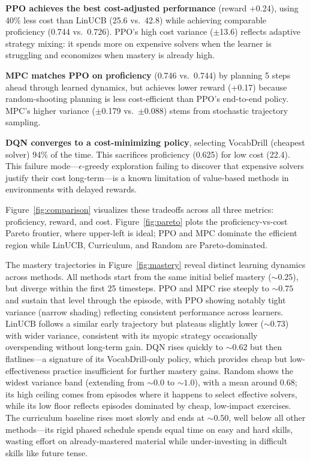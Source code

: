 \documentclass{article}
\begin{document}
\textbf{PPO achieves the best cost-adjusted performance} (reward +0.24), using 40\% less cost than LinUCB (25.6 vs.\ 42.8) while achieving comparable proficiency (0.744 vs.\ 0.726). PPO's high cost variance ($\pm$13.6) reflects adaptive strategy mixing: it spends more on expensive solvers when the learner is struggling and economizes when mastery is already high.

\textbf{MPC matches PPO on proficiency} (0.746 vs.\ 0.744) by planning 5 steps ahead through learned dynamics, but achieves lower reward (+0.17) because random-shooting planning is less cost-efficient than PPO's end-to-end policy. MPC's higher variance ($\pm$0.179 vs.\ $\pm$0.088) stems from stochastic trajectory sampling.

\textbf{DQN converges to a cost-minimizing policy}, selecting VocabDrill (cheapest solver) 94\% of the time. This sacrifices proficiency (0.625) for low cost (22.4). This failure mode---$\epsilon$-greedy exploration failing to discover that expensive solvers justify their cost long-term---is a known limitation of value-based methods in environments with delayed rewards.

Figure~\ref{fig:comparison} visualizes these tradeoffs across all three metrics: proficiency, reward, and cost. Figure~\ref{fig:pareto} plots the proficiency-vs-cost Pareto frontier, where upper-left is ideal; PPO and MPC dominate the efficient region while LinUCB, Curriculum, and Random are Pareto-dominated.

The mastery trajectories in Figure~\ref{fig:mastery} reveal distinct learning dynamics across methods. All methods start from the same initial belief mastery (${\sim}0.25$), but diverge within the first 25 timesteps. PPO and MPC rise steeply to ${\sim}0.75$ and sustain that level through the episode, with PPO showing notably tight variance (narrow shading) reflecting consistent performance across learners. LinUCB follows a similar early trajectory but plateaus slightly lower (${\sim}0.73$) with wider variance, consistent with its myopic strategy occasionally overspending without long-term gain. DQN rises quickly to ${\sim}0.62$ but then flatlines---a signature of its VocabDrill-only policy, which provides cheap but low-effectiveness practice insufficient for further mastery gains. Random shows the widest variance band (extending from ${\sim}0.0$ to ${\sim}1.0$), with a mean around 0.68; its high ceiling comes from episodes where it happens to select effective solvers, while its low floor reflects episodes dominated by cheap, low-impact exercises. The curriculum baseline rises most slowly and ends at ${\sim}0.50$, well below all other methods---its rigid phased schedule spends equal time on easy and hard skills, wasting effort on already-mastered material while under-investing in difficult skills like future tense.
\end{document}
